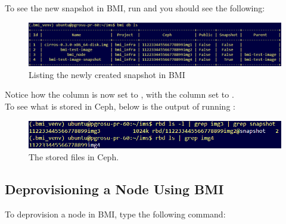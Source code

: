 To see the new snapshot in BMI, run  and you should see the following: \\


\begin{figure}[!h] %
\label{fig:bmi-workflow}
\begin{center}
\includegraphics[scale=0.7]{figures/bmi-snapshot-db-ls.png}
\end{center}
\caption{Listing the newly created snapshot in BMI}
\end{figure}


Notice how the  column is now set to , with the  column set to . \\  


To see what is stored in Ceph, below is the output of running : \\

\begin{figure}[!h] %
\label{fig:bmi-workflow}
\begin{center}
\includegraphics[scale=0.7]{figures/rbd-ls-snapshot.png}
\end{center}
\caption{The stored files in Ceph.}
\end{figure}



\subsection{Deprovisioning a Node Using BMI}

To deprovision a node in BMI, type the following command: 



